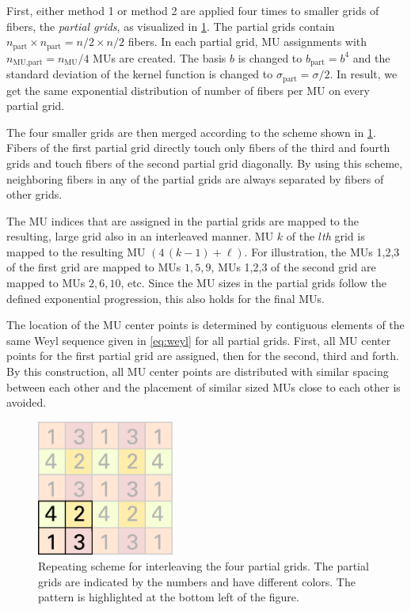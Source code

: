 First, either method 1 or method 2 are applied four times to smaller grids of fibers, the \emph{partial grids}, as visualized in \cref{fig:interleaving_scheme}. The partial grids contain $n_\text{part} \times n_\text{part} = n/2 \times n/2$ fibers. In each partial grid, MU assignments with $n_\text{MU,part} = n_\text{MU}/4$ MUs are created. The basis $b$ is changed to $b_\text{part} = b^4$ and the standard deviation of the kernel function is changed to $\sigma_\text{part} = \sigma/2$. In result, we get the same exponential distribution of number of fibers per MU on every partial grid.

The four smaller grids are then merged according to the scheme shown in \cref{fig:interleaving_scheme}. Fibers of the first partial grid directly touch only fibers of the third and fourth grids and touch fibers of the second partial grid diagonally. By using this scheme, neighboring fibers in any of the partial grids are always separated by fibers of other grids. 

The MU indices that are assigned in the partial grids are mapped to the resulting, large grid also in an interleaved manner. MU $k$ of the $l$\emph{th} grid is mapped to the resulting MU $(4\,(k-1)+\ell)$. For illustration, the MUs 1,2,3 of the first grid are mapped to MUs $1,5,9$, MUs 1,2,3 of the second grid are mapped to MUs $2,6,10$, etc. Since the MU sizes in the partial grids follow the defined exponential progression, this also holds for the final MUs. 

The location of the MU center points is determined by contiguous elements of the same Weyl sequence given in \cref{eq:weyl} for all partial grids. First, all MU center points for the first partial grid are assigned, then for the second, third and forth. By this construction, all MU center points are distributed with similar spacing between each other and the placement of similar sized MUs close to each other is avoided.

\begin{figure}%
  \centering%
  \includegraphics[width=0.4\textwidth]{images/motor_unit_assignment/interleaving_scheme.pdf}%
  \caption{Repeating scheme for interleaving the four partial grids. The partial grids are indicated by the numbers and have different colors. The pattern is highlighted at the bottom left of the figure.}%
  \label{fig:interleaving_scheme}%
\end{figure}

